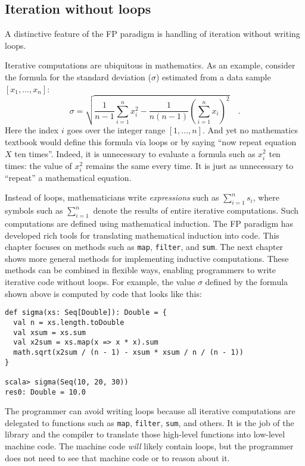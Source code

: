 \subsection{Iteration without loops}

A distinctive feature of the FP paradigm is handling of iteration
without writing loops.

Iterative computations are ubiquitous in mathematics. As an example,
consider the formula for the standard deviation ($\sigma$) estimated
from a data sample $\left[x_{1},...,x_{n}\right]$:
\[
\sigma=\sqrt{\frac{1}{n-1}\sum_{i=1}^{n}x_{i}^{2}-\frac{1}{n\left(n-1\right)}\left(\sum_{i=1}^{n}x_{i}\right)^{2}}\quad.
\]
Here the index $i$ goes over the integer range $\left[1,...,n\right]$.
And yet no mathematics textbook would define this formula via loops
or by saying \textsf{``}now repeat equation $X$ ten times\textsf{''}. Indeed, it
is unnecessary to evaluate a formula such as $x_{i}^{2}$ ten times:
the value of $x_{i}^{2}$ remains the same every time. It is just
as unnecessary to \textsf{``}repeat\textsf{''} a mathematical equation.

Instead of loops, mathematicians write \emph{expressions} such as
$\sum_{i=1}^{n}s_{i}$, where symbols such as $\sum_{i=1}^{n}$ denote
the results of entire iterative computations. Such computations are
defined using mathematical induction.
The FP paradigm has developed rich tools for translating mathematical
induction into code. This chapter focuses on methods such as \lstinline!map!,
\lstinline!filter!, and \lstinline!sum!. The next chapter shows
more general methods for implementing inductive computations. These
methods can be combined in flexible ways, enabling programmers to
write iterative code without loops. For example, the value $\sigma$
defined by the formula shown above is computed by code that looks
like this:
\begin{lstlisting}
def sigma(xs: Seq[Double]): Double = {
  val n = xs.length.toDouble
  val xsum = xs.sum
  val x2sum = xs.map(x => x * x).sum
  math.sqrt(x2sum / (n - 1) - xsum * xsum / n / (n - 1))
}

scala> sigma(Seq(10, 20, 30))
res0: Double = 10.0
\end{lstlisting}

The programmer can avoid writing loops because all iterative computations
are delegated to functions such as \lstinline!map!, \lstinline!filter!,
\lstinline!sum!, and others. It is the job of the library and the
compiler to translate those high-level functions into low-level machine
code. The machine code \emph{will} likely contain loops, but the programmer
does not need to see that machine code or to reason about it.

